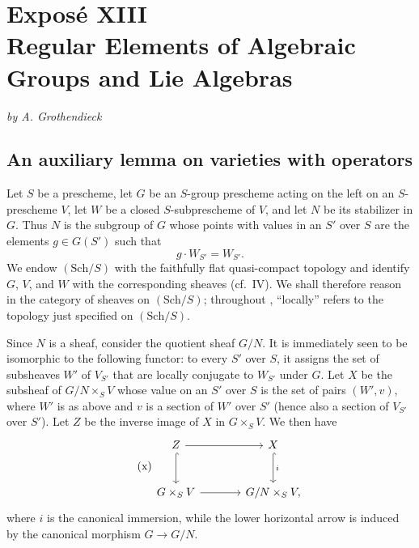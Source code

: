 
\chapter*{Exposé XIII\\Regular Elements of Algebraic Groups and Lie Algebras}

\begin{center}
\textit{by A. Grothendieck}
\end{center}

\section{An auxiliary lemma on varieties with operators}

Let \(S\) be a prescheme, let \(G\) be an \(S\)-group prescheme acting
on the left on an \(S\)-prescheme \(V\), let \(W\) be a closed
\(S\)-subprescheme of \(V\), and let \(N\) be its stabilizer in \(G\).
Thus \(N\) is the subgroup of \(G\) whose points with values in an
\(S'\) over \(S\) are the elements \(g\in G(S')\) such that
\[
  g\cdot W_{S'}=W_{S'}.
\]
We endow \((\mathrm{Sch}/S)\) with the faithfully flat
quasi-compact topology and identify \(G\), \(V\), and \(W\) with the
corresponding sheaves (cf.\ IV).
We shall therefore reason in the category of sheaves on
\((\mathrm{Sch}/S)\); throughout , ``locally'' refers to
the topology just specified on \((\mathrm{Sch}/S)\).

Since \(N\) is a sheaf, consider the quotient sheaf \(G/N\). It is
immediately seen to be isomorphic to the following functor: to every
\(S'\) over \(S\), it assigns the set of subsheaves \(W'\) of
\(V_{S'}\) that are locally conjugate to \(W_{S'}\) under \(G\).
Let \(X\) be the subsheaf of \(G/N\times_S V\) whose value on an
\(S'\) over \(S\) is the set of pairs \((W',v)\), where \(W'\) is as
above and \(v\) is a section of \(W'\) over \(S'\) (hence also a
section of \(V_{S'}\) over \(S'\)). Let \(Z\) be the inverse image of
\(X\) in \(G\times_S V\). We then have 
\[
\tag{x}\label{sga3:xiii:equation:x}
\begin{tikzcd}[column sep=large,row sep=large]
Z \arrow[r] \arrow[d,hook] & X \arrow[d,hook,"i"] \\
G\times_S V \arrow[r] & G/N\times_S V ,
\end{tikzcd}
\]
where \(i\) is the canonical immersion, while the lower horizontal
arrow is induced by the canonical morphism \(G\to G/N\).

